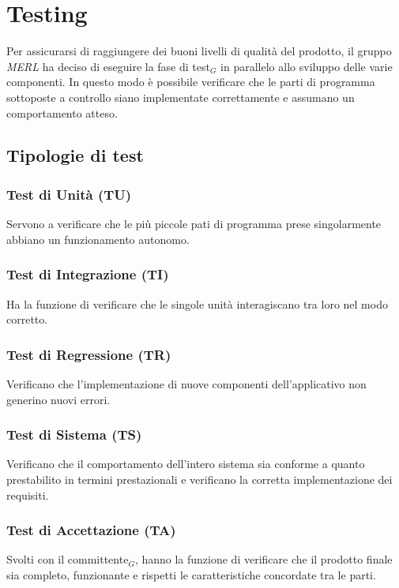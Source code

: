 \chapter{Testing}
Per assicurarsi di raggiungere dei buoni livelli di qualità del prodotto, il gruppo \textit{MERL} ha deciso di eseguire la fase di test$_G$ in parallelo allo sviluppo delle varie componenti. In questo modo è possibile verificare che le parti di programma sottoposte a controllo siano implementate correttamente e assumano un comportamento atteso.
\section{Tipologie di test}
    \subsection{Test di Unità (TU)}  Servono a verificare che le più piccole pati di programma prese singolarmente abbiano un funzionamento autonomo.
    \subsection{Test di Integrazione (TI)} Ha la funzione di verificare che le singole unità interagiscano tra loro nel modo corretto.
    \subsection{Test di Regressione (TR)} Verificano che l'implementazione di nuove componenti dell'applicativo non generino nuovi errori.
    \subsection{Test di Sistema (TS)} Verificano che il comportamento dell'intero sistema sia conforme a quanto prestabilito in termini prestazionali e verificano la corretta implementazione dei requisiti.
    \subsection{Test di Accettazione (TA)} Svolti con il committente$_G$, hanno la funzione di verificare che il prodotto
        finale sia completo, funzionante e rispetti le caratteristiche concordate tra le parti.


